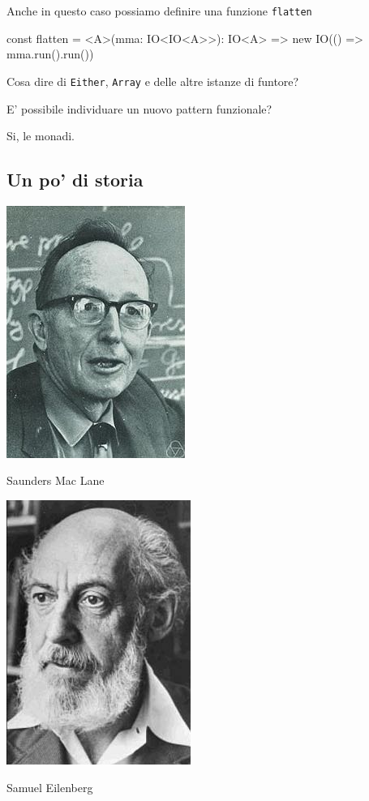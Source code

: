 \documentclass[12pt]{article}
\theoremstyle{definition}
\newenvironment{code}
  {\vspace{0.5cm} \VerbatimEnvironment\begin{typescriptcode}}
  {\end{typescriptcode} \vspace{0.2cm}}
\begin{document}
Anche in questo caso possiamo definire una funzione \texttt{flatten}

\begin{code}
const flatten = <A>(mma: IO<IO<A>>): IO<A> =>
  new IO(() => mma.run().run())
\end{code}

Cosa dire di \texttt{Either}, \texttt{Array} e delle altre istanze di funtore?

E' possibile individuare un nuovo pattern funzionale?

Si, le monadi.

\subsection{Un po' di storia}

\begin{center}
\includegraphics[scale=0.6]{maclane}

Saunders Mac Lane
\end{center}

\begin{center}
\includegraphics[scale=0.6]{eilenberg}

Samuel Eilenberg
\end{center}
\end{document}
